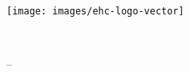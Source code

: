 \vspace{-0.5cm}
\texttt{[image: images/ehc-logo-vector]}

\vspace{8.5cm}
\begin{minipage}{\textwidth}
    \sffamily

    \vspace{2mm}
    {\YUGE \raggedleft\bookletunittitle\\}

    \vspace{1mm}
    {\huge \raggedleft\coursetitle { }-- \formattedunittitle\\}

    \vspace{2mm}
    {\small \raggedleft\bookletsubtitle\\}
\end{minipage}
